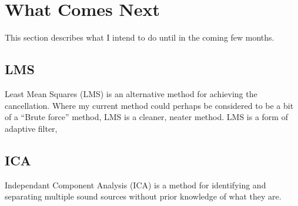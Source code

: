 \newpage
\section{What Comes Next}

This section describes what I intend to do until in the coming few months.

\subsection{LMS}
Least Mean Squares (LMS) is an alternative method for achieving the cancellation.
Where my current method could perhaps be considered to be a bit of a ``Brute force'' method, LMS is a cleaner, neater method.
LMS is a form of adaptive filter,

\subsection{ICA}
Independant Component Analysis (ICA) is a method for identifying and separating multiple sound sources without prior knowledge of what they are.

